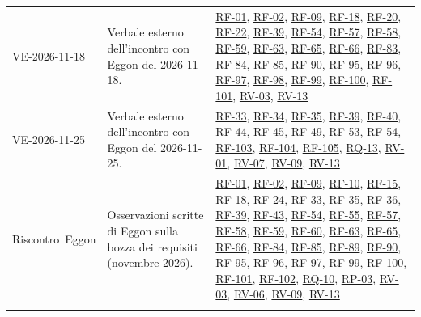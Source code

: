 \documentclass[documento]{gpt}
\begin{document}
{\begin{longtable}{@{}p{2.6cm}>{\raggedright\arraybackslash}p{7.0cm}>{\raggedright\arraybackslash}p{5.2cm}@{}}
\mbox{VE-2026-11-18} & Verbale esterno dell'incontro con Eggon del 2026-11-18. & \hyperlink{req:RF-01}{RF-01}, \hyperlink{req:RF-02}{RF-02}, \hyperlink{req:RF-09}{RF-09}, \hyperlink{req:RF-18}{RF-18}, \hyperlink{req:RF-20}{RF-20}, \hyperlink{req:RF-22}{RF-22}, \hyperlink{req:RF-39}{RF-39}, \hyperlink{req:RF-54}{RF-54}, \hyperlink{req:RF-57}{RF-57}, \hyperlink{req:RF-58}{RF-58}, \hyperlink{req:RF-59}{RF-59}, \hyperlink{req:RF-63}{RF-63}, \hyperlink{req:RF-65}{RF-65}, \hyperlink{req:RF-66}{RF-66}, \hyperlink{req:RF-83}{RF-83}, \hyperlink{req:RF-84}{RF-84}, \hyperlink{req:RF-85}{RF-85}, \hyperlink{req:RF-90}{RF-90}, \hyperlink{req:RF-95}{RF-95}, \hyperlink{req:RF-96}{RF-96}, \hyperlink{req:RF-97}{RF-97}, \hyperlink{req:RF-98}{RF-98}, \hyperlink{req:RF-99}{RF-99}, \hyperlink{req:RF-100}{RF-100}, \hyperlink{req:RF-101}{RF-101}, \hyperlink{req:RV-03}{RV-03}, \hyperlink{req:RV-13}{RV-13} \\
\mbox{VE-2026-11-25} & Verbale esterno dell'incontro con Eggon del 2026-11-25. & \hyperlink{req:RF-33}{RF-33}, \hyperlink{req:RF-34}{RF-34}, \hyperlink{req:RF-35}{RF-35}, \hyperlink{req:RF-39}{RF-39}, \hyperlink{req:RF-40}{RF-40}, \hyperlink{req:RF-44}{RF-44}, \hyperlink{req:RF-45}{RF-45}, \hyperlink{req:RF-49}{RF-49}, \hyperlink{req:RF-53}{RF-53}, \hyperlink{req:RF-54}{RF-54}, \hyperlink{req:RF-103}{RF-103}, \hyperlink{req:RF-104}{RF-104}, \hyperlink{req:RF-105}{RF-105}, \hyperlink{req:RQ-13}{RQ-13}, \hyperlink{req:RV-01}{RV-01}, \hyperlink{req:RV-07}{RV-07}, \hyperlink{req:RV-09}{RV-09}, \hyperlink{req:RV-13}{RV-13} \\
\mbox{Riscontro Eggon} & Osservazioni scritte di Eggon sulla bozza dei requisiti (novembre 2026). & \hyperlink{req:RF-01}{RF-01}, \hyperlink{req:RF-02}{RF-02}, \hyperlink{req:RF-09}{RF-09}, \hyperlink{req:RF-10}{RF-10}, \hyperlink{req:RF-15}{RF-15}, \hyperlink{req:RF-18}{RF-18}, \hyperlink{req:RF-24}{RF-24}, \hyperlink{req:RF-33}{RF-33}, \hyperlink{req:RF-35}{RF-35}, \hyperlink{req:RF-36}{RF-36}, \hyperlink{req:RF-39}{RF-39}, \hyperlink{req:RF-43}{RF-43}, \hyperlink{req:RF-54}{RF-54}, \hyperlink{req:RF-55}{RF-55}, \hyperlink{req:RF-57}{RF-57}, \hyperlink{req:RF-58}{RF-58}, \hyperlink{req:RF-59}{RF-59}, \hyperlink{req:RF-60}{RF-60}, \hyperlink{req:RF-63}{RF-63}, \hyperlink{req:RF-65}{RF-65}, \hyperlink{req:RF-66}{RF-66}, \hyperlink{req:RF-84}{RF-84}, \hyperlink{req:RF-85}{RF-85}, \hyperlink{req:RF-89}{RF-89}, \hyperlink{req:RF-90}{RF-90}, \hyperlink{req:RF-95}{RF-95}, \hyperlink{req:RF-96}{RF-96}, \hyperlink{req:RF-97}{RF-97}, \hyperlink{req:RF-99}{RF-99}, \hyperlink{req:RF-100}{RF-100}, \hyperlink{req:RF-101}{RF-101}, \hyperlink{req:RF-102}{RF-102}, \hyperlink{req:RQ-10}{RQ-10}, \hyperlink{req:RP-03}{RP-03}, \hyperlink{req:RV-03}{RV-03}, \hyperlink{req:RV-06}{RV-06}, \hyperlink{req:RV-09}{RV-09}, \hyperlink{req:RV-13}{RV-13} \\
\addlinespace
\end{longtable}}
\end{document}
